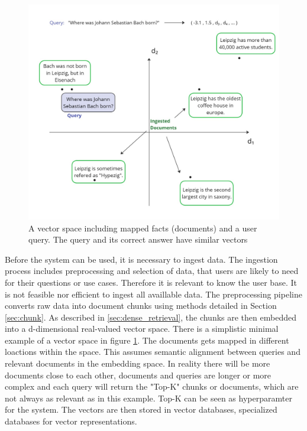 \begin{figure}[h!]
    \centering
    \includegraphics[width=\textwidth]{images/VectorDB.pdf}
    \caption{A vector space including mapped facts (documents) and a user query. The query and its correct answer have similar vectors}
    \label{fig:vectorDB}
\end{figure}


Before the system can be used, it is necessary to ingest data. The ingestion process includes preprocessing and selection of data, that users are likely to need for their questions or use cases. Therefore it is relevant to know the user base. It is not feasible nor efficient to ingest all availlable data. The preprocessing pipeline converts raw data into document chunks using methods detailed in Section \ref{sec:chunk}. As described in \ref{sec:dense_retrieval}, the chunks are then embedded into a d-dimensional real-valued vector space. There is a simplistic minimal example of a vector space in figure \ref{fig:vectorDB}. The documents gets mapped in different loactions within the space. This assumes semantic alignment between queries and relevant documents in the embedding space. In reality there will be more documents close to each other, documents and queries are longer or more complex and each query will return the "Top-K" chunks or documents, which are not always as relevant as in this example. Top-K can be seen as hyperparamter for the system. The vectors are then stored in vector databases, specialized databases for vector representations.


